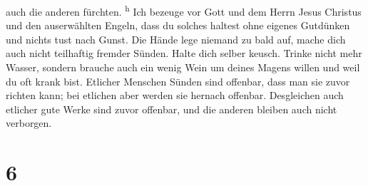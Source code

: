 auch die anderen fürchten. \textsuperscript{h}  Ich
bezeuge vor Gott und dem Herrn Jesus Christus und den auserwählten
Engeln, dass du solches haltest ohne eigenes Gutdünken und nichts tust
nach Gunst.  Die Hände lege niemand zu bald auf, mache
dich auch nicht teilhaftig fremder Sünden. Halte dich selber keusch.
 Trinke nicht mehr Wasser, sondern brauche auch ein wenig
Wein um deines Magens willen und weil du oft krank bist. 
Etlicher Menschen Sünden sind offenbar, dass man sie zuvor richten kann;
bei etlichen aber werden sie hernach offenbar. 
Desgleichen auch etlicher gute Werke sind zuvor offenbar, und die
anderen bleiben auch nicht verborgen.

\hypertarget{section-5}{%
\section{6}\label{section-5}}

